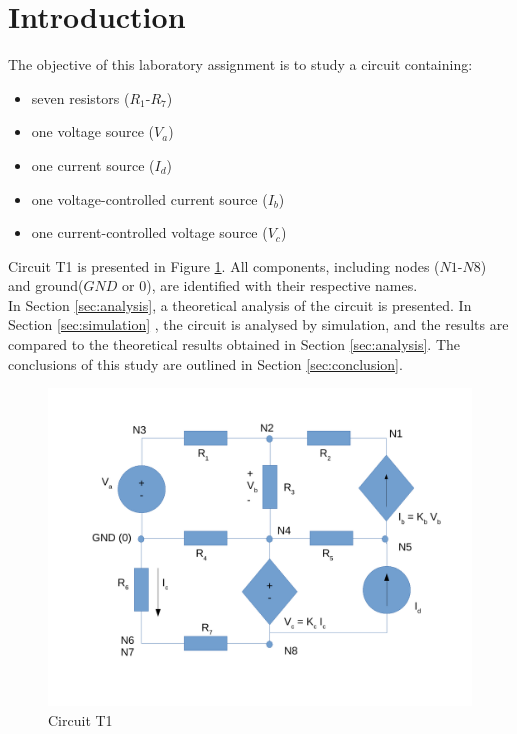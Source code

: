 \section{Introduction}
\label{sec:introduction}


The objective of this laboratory assignment is to study a circuit containing:
\begin{itemize}
	\item seven resistors ($R_1$-$R_7$)
	\item one voltage source ($V_a$)
	\item one current source ($I_d$)
	\item one voltage-controlled current source ($I_b$)
	\item one current-controlled voltage source ($V_c$)
\end{itemize}

Circuit T1 is presented in Figure \ref{fig:Desenho_t1}. All components, including nodes
($N1$-$N8$) and ground($GND$ or $0$), are identified with their respective names. \\

In Section \ref{sec:analysis}, a theoretical analysis of the circuit is
presented. In Section \ref{sec:simulation} , the circuit is analysed by
simulation, and the results are compared to the theoretical results
obtained in Section \ref{sec:analysis}. The conclusions of this study
are outlined in Section \ref{sec:conclusion}.


\begin{figure}[h]
	\centering
	\includegraphics[width=0.85\linewidth]{dsnh_t1.pdf}
	\caption{Circuit T1}
\label{fig:Desenho_t1}
\end{figure}


